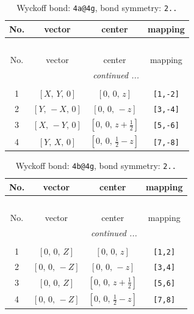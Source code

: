 \documentclass[fleqn,8pt]{jsarticle}
\begin{document}
\begin{longtable}{cccc}
\caption{Wyckoff bond: {\tt 4a@4g}, bond symmetry: {\tt 2..}}
 \\
 \hline \hline
No. & vector & center & mapping \\ \hline \endfirsthead

\multicolumn{3}{l}{\tablename\ \thetable{}} \\
 \hline \hline
No. & vector & center & mapping \\ \hline \endhead

 \hline \hline
\multicolumn{3}{r}{\footnotesize\it continued ...} \\ \endfoot

 \hline \hline
\multicolumn{3}{r}{} \\ \endlastfoot

1 & $\left[ X,\, Y,\, 0 \right]$ & $\left[ 0,\, 0,\, z \right]$ & {\tt [1,-2]} \\ \hline
2 & $\left[ Y,\, - X,\, 0 \right]$ & $\left[ 0,\, 0,\, - z \right]$ & {\tt [3,-4]} \\ \hline
3 & $\left[ X,\, - Y,\, 0 \right]$ & $\left[ 0,\, 0,\, z + \frac{1}{2} \right]$ & {\tt [5,-6]} \\ \hline
4 & $\left[ Y,\, X,\, 0 \right]$ & $\left[ 0,\, 0,\, \frac{1}{2} - z \right]$ & {\tt [7,-8]} \\
\end{longtable}
\renewcommand{\arraystretch}{1.2}
\begin{longtable}{cccc}
\caption{Wyckoff bond: {\tt 4b@4g}, bond symmetry: {\tt 2..}}
 \\
 \hline \hline
No. & vector & center & mapping \\ \hline \endfirsthead

\multicolumn{3}{l}{\tablename\ \thetable{}} \\
 \hline \hline
No. & vector & center & mapping \\ \hline \endhead

 \hline \hline
\multicolumn{3}{r}{\footnotesize\it continued ...} \\ \endfoot

 \hline \hline
\multicolumn{3}{r}{} \\ \endlastfoot

1 & $\left[ 0,\, 0,\, Z \right]$ & $\left[ 0,\, 0,\, z \right]$ & {\tt [1,2]} \\ \hline
2 & $\left[ 0,\, 0,\, - Z \right]$ & $\left[ 0,\, 0,\, - z \right]$ & {\tt [3,4]} \\ \hline
3 & $\left[ 0,\, 0,\, Z \right]$ & $\left[ 0,\, 0,\, z + \frac{1}{2} \right]$ & {\tt [5,6]} \\ \hline
4 & $\left[ 0,\, 0,\, - Z \right]$ & $\left[ 0,\, 0,\, \frac{1}{2} - z \right]$ & {\tt [7,8]} \\
\end{longtable}
\end{document}
